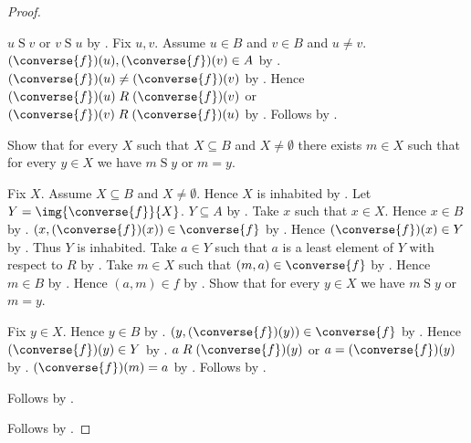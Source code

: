 \begin{proof}
\begin{subproof}
            $u\mathrel{S}v$ or $v\mathrel{S}u$ by .
        Fix $u,v$.
        Assume $u\in B$ and $v\in B$ and $u\neq v$.
        $(\converse{f})(u),(\converse{f})(v)\in A$
            by .
        $(\converse{f})(u)\neq(\converse{f})(v)$
            by .
        Hence $(\converse{f})(u)\mathrel{R}(\converse{f})(v)$ or
            $(\converse{f})(v)\mathrel{R}(\converse{f})(u)$
            by
            .
        Follows by .
    \end{subproof}
    Show that for every $X$ such that $X\subseteq B$ and $X\neq\emptyset$
        there exists $m\in X$ such that for every $y\in X$ we have
        $m\mathrel{S}y$ or $m=y$.
    \begin{subproof}
        Fix $X$.
        Assume $X\subseteq B$ and $X\neq\emptyset$.
        Hence $X$ is inhabited by .
        Let $Y=\img{\converse{f}}{X}$.
        $Y\subseteq A$
            by .
        Take $x$ such that $x\in X$.
        Hence $x\in B$ by .
        $(x,(\converse{f})(x))\in\converse{f}$
            by .
        Hence $(\converse{f})(x)\in Y$ by .
        Thus $Y$ is inhabited.
        Take $a\in Y$ such that $a$ is a least element of $Y$
            with respect to $R$ by .
        Take $m\in X$ such that $(m,a)\in\converse{f}$
            by .
        Hence $m\in B$ by .
        Hence $(a,m)\in f$ by .
        Show that for every $y\in X$ we have $m\mathrel{S}y$ or $m=y$.
        \begin{subproof}
            Fix $y\in X$.
            Hence $y\in B$ by .
            $(y,(\converse{f})(y))\in\converse{f}$
                by .
            Hence $(\converse{f})(y)\in Y$
                by .
            $a\mathrel{R}(\converse{f})(y)$ or
                $a=(\converse{f})(y)$
                by .
            $(\converse{f})(m)=a$
                by .
            Follows by .
        \end{subproof}
        Follows by \auto.
    \end{subproof}
    Follows by .
\end{proof}
